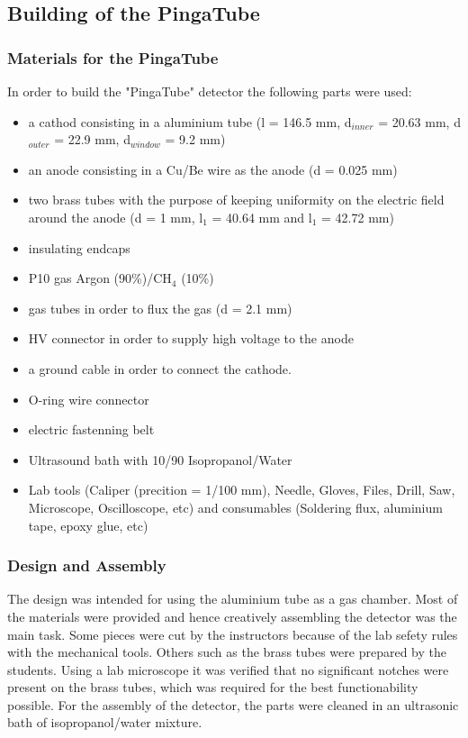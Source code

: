 \subsection{Building of the PingaTube}
\label{sec:building-pingatube}

\subsubsection{Materials for the PingaTube}
\label{sec:materials_pingatube}
In order to build the "PingaTube" detector the following parts were used:
\begin{itemize}
\item a cathod consisting in a aluminium tube (l = 146.5 mm, d$_{inner}$ = 20.63
  mm, d$_{outer}$ = 22.9 mm, d$_{window}$ = 9.2 mm)
\item an anode consisting in a Cu/Be wire as the anode (d = 0.025 mm)
\item two brass tubes with the purpose of keeping uniformity on the electric
  field around the anode (d = 1 mm, l$_{1}$ = 40.64 mm and l$_{1}$ = 42.72 mm)
\item insulating endcaps
\item P10 gas Argon (90\%)/CH$_{4}$ (10\%)
\item gas tubes in order to flux the gas (d = 2.1 mm)
\item HV connector in order to supply high voltage to the anode
\item a ground cable in order to connect the cathode.
\item O-ring wire connector
\item electric fastenning belt
\item Ultrasound bath with 10/90 Isopropanol/Water
\item Lab tools (Caliper (precition = 1/100 mm), Needle, Gloves, Files, Drill,
  Saw, Microscope, Oscilloscope, etc) and consumables (Soldering flux, aluminium
  tape, epoxy glue, etc)
\end{itemize}

\subsubsection{Design and Assembly}
\label{sec:design_and_assembly_beercan}
The design was intended for using the aluminium tube as a gas chamber. Most of
the materials were provided and hence creatively assembling the detector was the
main task.  Some pieces were cut by the instructors because of the lab sefety
rules with the mechanical tools. Others such as the brass tubes were prepared by
the students.  Using a lab microscope it was verified that no significant
notches were present on the brass tubes, which was required for the best
functionability possible.  For the assembly of the detector, the parts were
cleaned in an ultrasonic bath of isopropanol/water mixture.

